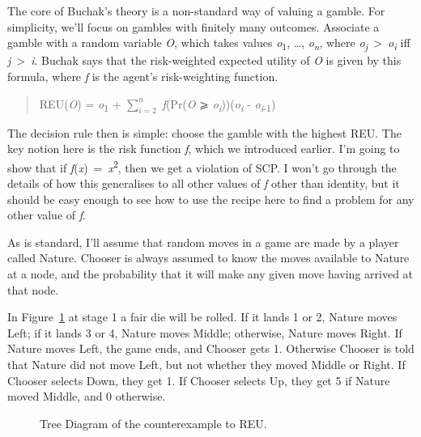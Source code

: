 \documentclass[
  10pt,
  letterpaper,
  DIV=11,
  numbers=noendperiod,
  twoside]{scrartcl}
\begin{document}
The core of Buchak's theory is a non-standard way of valuing a gamble.
For simplicity, we'll focus on gambles with finitely many outcomes.
Associate a gamble with a random variable \emph{O}, which takes values
\emph{o}\textsubscript{1}, \ldots, \emph{o\textsubscript{n}}, where
\emph{o\textsubscript{j}}~\textgreater~\emph{o\textsubscript{i}} iff
\emph{j}~\textgreater~\emph{i}. Buchak says that the risk-weighted
expected utility of \emph{O} is given by this formula, where \emph{f} is
the agent's risk-weighting function.

\begin{quote}
REU(\emph{O}) = \emph{o}\textsubscript{1} + \(\sum_{i = 2}^n\)
\emph{f}(Pr(\emph{O} ⩾
\emph{o\textsubscript{i}}))(\emph{o\textsubscript{i}} -
\emph{o}\textsubscript{\emph{i}-1})
\end{quote}

The decision rule then is simple: choose the gamble with the highest
REU. The key notion here is the risk function \emph{f}, which we
introduced earlier. I'm going to show that if
\emph{f}(\emph{x})~=~\emph{x}\textsuperscript{2}, then we get a
violation of SCP. I won't go through the details of how this generalises
to all other values of \emph{f} other than identity, but it should be
easy enough to see how to use the recipe here to find a problem for any
other value of \emph{f}.

As is standard, I'll assume that random moves in a game are made by a
player called Nature. Chooser is always assumed to know the moves
available to Nature at a node, and the probability that it will make any
given move having arrived at that node.

In Figure~\ref{fig-buchak} at stage 1 a fair die will be rolled. If it
lands 1 or 2, Nature moves Left; if it lands 3 or 4, Nature moves
Middle; otherwise, Nature moves Right. If Nature moves Left, the game
ends, and Chooser gets 1. Otherwise Chooser is told that Nature did not
move Left, but not whether they moved Middle or Right. If Chooser
selects Down, they get 1. If Chooser selects Up, they get 5 if Nature
moved Middle, and 0 otherwise.

\begin{figure}


\caption{\label{fig-buchak}Tree Diagram of the counterexample to REU.}

\end{figure}%
\end{document}
